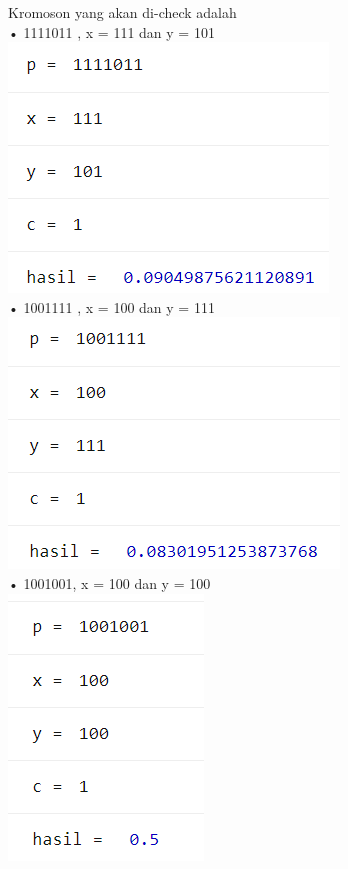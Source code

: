 \documentclass[12pt]{article}
\begin{document}
\begin{enumerate}[label=(\alph*)]
\begin{verbatim}
  	\end{verbatim}
  	Kromoson yang akan di-check adalah \\
  	•	1111011 , x = 111 dan y = 101\\
  	  	\includegraphics[scale=1]{UASFiskom0405.png}\\
  	•	1001111 , x = 100 dan y = 111\\
  	  	\includegraphics[scale=1]{UASFiskom0406.png}\\
  	•	1001001, x = 100 dan y = 100\\
  	  	\includegraphics[scale=1]{UASFiskom0407.png}\\

\end{enumerate}
\end{document}
